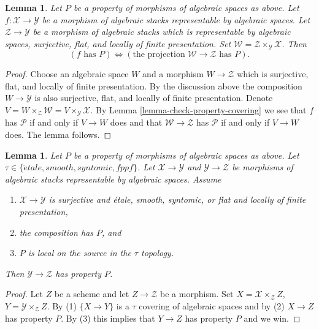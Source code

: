 \documentclass{stacks-project}
\theoremstyle{plain}
\newtheorem{lemma}[subsection]{Lemma}
\theoremstyle{definition}
\theoremstyle{remark}
\numberwithin{equation}{subsection}
\def\etale{{\acute{e}tale}}
\begin{document}
\begin{lemma}
\label{lemma-check-property-weak-covering}
Let $P$ be a property of morphisms of algebraic spaces as above.
Let $f : \mathcal{X} \to \mathcal{Y}$ be a morphism of algebraic stacks
representable by algebraic spaces.
Let $\mathcal{Z} \to \mathcal{Y}$ be a morphism of algebraic stacks which
is representable by algebraic spaces, surjective, flat, and
locally of finite presentation.
Set $\mathcal{W} = \mathcal{Z} \times_\mathcal{Y} \mathcal{X}$. Then
$$
(f\text{ has }P) \Leftrightarrow
(\text{the projection }\mathcal{W} \to \mathcal{Z}\text{ has }P).
$$
\end{lemma}

\begin{proof}
Choose an algebraic space $W$ and a morphism
$W \to \mathcal{Z}$ which is surjective, flat, and locally of finite
presentation. By the discussion above the composition
$W \to \mathcal{Y}$ is also surjective, flat, and locally of finite
presentation. Denote
$V = W \times_\mathcal{Z} \mathcal{W} = V \times_\mathcal{Y} \mathcal{X}$.
By
Lemma \ref{lemma-check-property-covering}
we see that $f$ has $\mathcal{P}$ if and only if $V \to W$ does
and that $\mathcal{W} \to \mathcal{Z}$ has $\mathcal{P}$ if and only
if $V \to W$ does. The lemma follows.
\end{proof}

\begin{lemma}
\label{lemma-check-property-after-precomposing}
Let $P$ be a property of morphisms of algebraic spaces as above.
Let $\tau \in \{\etale, smooth, syntomic, fppf\}$.
Let $\mathcal{X} \to \mathcal{Y}$ and $\mathcal{Y} \to \mathcal{Z}$
be morphisms of algebraic stacks representable by algebraic spaces.
Assume
\begin{enumerate}
\item $\mathcal{X} \to \mathcal{Y}$ is surjective and
\'etale, smooth, syntomic, or flat and locally of finite presentation,
\item the composition has $P$, and
\item $P$ is local on the source in the $\tau$ topology.
\end{enumerate}
Then $\mathcal{Y} \to \mathcal{Z}$ has property $P$.
\end{lemma}

\begin{proof}
Let $Z$ be a scheme and let $Z \to \mathcal{Z}$ be a morphism.
Set $X = \mathcal{X} \times_\mathcal{Z} Z$,
$Y = \mathcal{Y} \times_\mathcal{Z} Z$. By (1) $\{X \to Y\}$
is a $\tau$ covering of algebraic spaces and by (2) $X \to Z$ has property
$P$. By (3) this implies that $Y \to Z$ has property $P$
and we win.
\end{proof}
\end{document}
